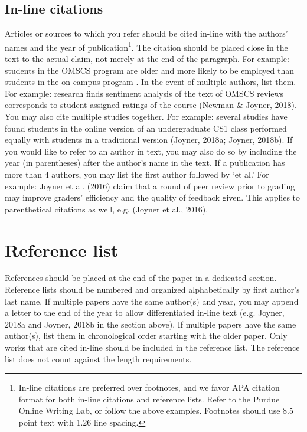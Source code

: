 \documentclass[11pt,a4paper,usenames,dvipsnames]{article}
\begin{document}
\subsection{In-line citations}
Articles or sources to which you refer should be cited in-line with the authors’ names and the year of publication\footnote{In-line citations are preferred over footnotes, and we favor APA citation format for both in-line citations and reference lists. Refer to the Purdue Online Writing Lab, or follow the above examples. Footnotes should use 8.5 point text with 1.26 line spacing.}.  The citation should be placed close in the text to the actual claim, not merely at the end of the paragraph. For example: students in the OMSCS program are older and more likely to be employed than students in the on-campus program \parencite{joyner2018a}. In the event of multiple authors, list them. For example: research finds sentiment analysis of the text of OMSCS reviews corresponds to student-assigned ratings of the course (Newman \& Joyner, 2018). You may also cite multiple studies together. For example: several studies have found students in the online version of an undergraduate CS1 class performed equally with students in a traditional version (Joyner, 2018a; Joyner, 2018b). If you would like to refer to an author in text, you may also do so by including the year (in parentheses) after the author’s name in the text. If a publication has more than 4 authors, you may list the first author followed by ‘et al.’ For example: Joyner et al. (2016) claim that a round of peer review prior to grading may improve graders’ efficiency and the quality of feedback given. This applies to parenthetical citations as well, e.g. (Joyner et al., 2016).

\section{Reference list}
References should be placed at the end of the paper in a dedicated section. Reference lists should be numbered and organized alphabetically by first author’s last name. If multiple papers have the same author(s) and year, you may append a letter to the end of the year to allow differentiated in-line text (e.g. Joyner, 2018a and Joyner, 2018b in the section above). If multiple papers have the same author(s), list them in chronological order starting with the older paper. Only works that are cited in-line should be included in the reference list. The reference list does not count against the length requirements.
\end{document}

